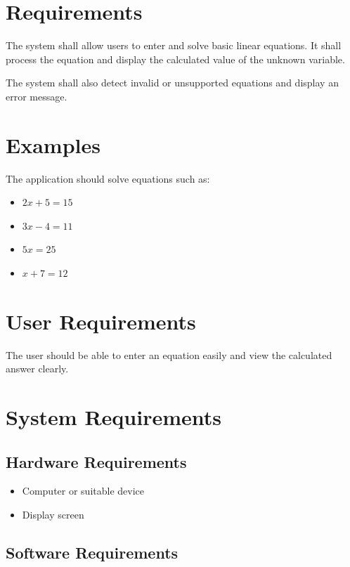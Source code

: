 \documentclass[12pt,a4paper]{article}
\begin{document}
\section{Requirements}

The system shall allow users to enter and solve basic linear
equations. It shall process the equation and display the
calculated value of the unknown variable.

The system shall also detect invalid or unsupported equations
and display an error message.

\section{Examples}

The application should solve equations such as:

\begin{itemize}
    \item $2x + 5 = 15$
    \item $3x - 4 = 11$
    \item $5x = 25$
    \item $x + 7 = 12$
\end{itemize}

\section{User Requirements}

The user should be able to enter an equation easily and view
the calculated answer clearly.

\section{System Requirements}

\subsection{Hardware Requirements}

\begin{itemize}
    \item Computer or suitable device
    \item Display screen
\end{itemize}

\subsection{Software Requirements}
\end{document}
